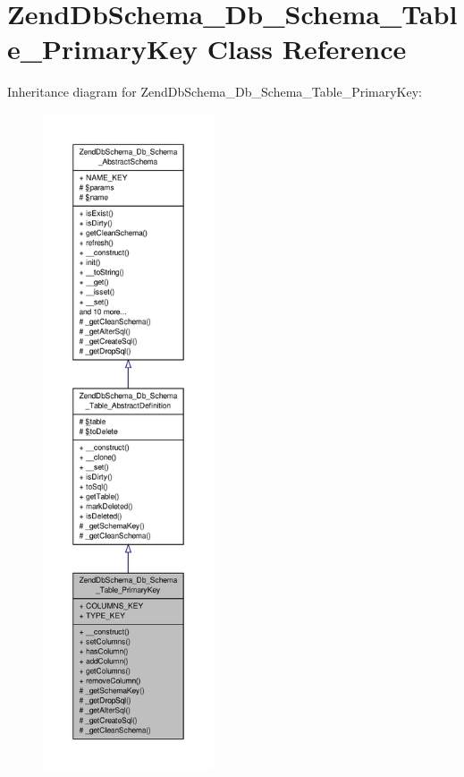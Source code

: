 \hypertarget{classZendDbSchema__Db__Schema__Table__PrimaryKey}{\section{Zend\-Db\-Schema\-\_\-\-Db\-\_\-\-Schema\-\_\-\-Table\-\_\-\-Primary\-Key Class Reference}
\label{classZendDbSchema__Db__Schema__Table__PrimaryKey}
}


Inheritance diagram for Zend\-Db\-Schema\-\_\-\-Db\-\_\-\-Schema\-\_\-\-Table\-\_\-\-Primary\-Key\-:\nopagebreak
\begin{figure}[H]
\begin{center}
\leavevmode
\includegraphics[height=550pt]{classZendDbSchema__Db__Schema__Table__PrimaryKey__inherit__graph}
\end{center}
\end{figure}


